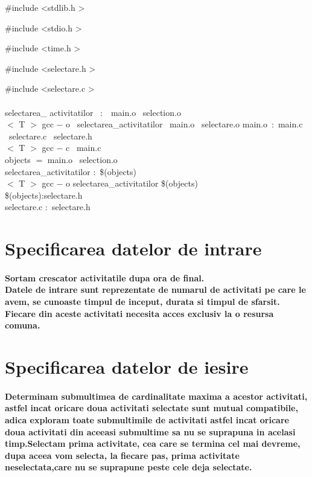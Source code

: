 \documentclass[12pt, a4paper,oneside]{article}
\begin{document}
 \#include \textless stdlib.h \textgreater \

  \#include \textless stdio.h \textgreater \
 
    \#include \textless time.h \textgreater \
  
     \#include \textless selectare.h \textgreater \
     
     \#include \textless selectare.c \textgreater \\\\
{selectarea\_ activitatilor \ $:$ \ main.o \ selection.o \\

 $<$ T $>$  gcc $-$ o \ selectarea\_activitatilor \ main.o \  selectare.o
 main.o\ $:$ main.c \ selectare.c \ selectare.h \\
 
 $<$ T $>$ gcc  $-$ c \ main.c \\
 
 objects $=$ main.o \ selection.o \\
 
 selectarea\_activitatilor $:$ \$(objects) \\
 
 $<$ T  $>$ gcc $-$ o selectarea\_activitatilor \$(objects)\\
 
 \$(objects):selectare.h \\
 
 selectare.c $:$ selectare.h}
 
\newpage
\large
\section{Specificarea datelor de intrare }
\paragraph{
Sortam crescator activitatile dupa ora de final.\\
Datele de intrare sunt reprezentate de numarul de activitati pe care le avem, se cunoaste timpul de inceput, durata si timpul de sfarsit.\\
Fiecare din aceste activitati necesita acces exclusiv la o resursa comuna. \\
}
\section{Specificarea datelor de iesire}
\large{} 
\paragraph{
Determinam submultimea de cardinalitate maxima a acestor activitati, astfel incat oricare doua activitati selectate sunt mutual compatibile, adica exploram toate submultimile de activitati astfel incat oricare doua activitati din aceeasi submultime sa nu se suprapuna in acelasi timp.Selectam prima activitate, cea care se termina cel mai devreme,  dupa aceea vom selecta, la fiecare pas, prima activitate neselectata,care nu se suprapune peste cele deja selectate. \\
}
\end{document}

